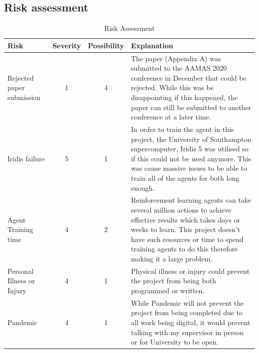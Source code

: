 \subsection*{Risk assessment}
\begin{table}[h]
    \centering
    \begin{tabular}{|p{3cm}|c|c|p{7cm}|} \hline
        \textbf{Risk}  & \textbf{Severity} & \textbf{Possibility} & \textbf{Explanation} \\ \hline
        Rejected paper submission & 1 & 4 & The paper (Appendix A) was submitted to the AAMAS 2020 conference in
            December that could be rejected. While this was be disappointing if this happened, the paper can still be
            submitted to another conference at a later time. \\ \hline
        Iridis failure & 5 & 1 & In order to train the agent in this project, the University of Southampton supercomputer,
            Iridis 5 was utilised so if this could not be used anymore. This was cause massive issues to be able to
            train all of the agents for both long enough. \\ \hline
        Agent Training time & 4 & 2 & Reinforcement learning agents can take several million actions to achieve
            effective results which takes days or weeks to learn. This project doesn't have such resources or time to
            spend training agents to do this therefore making it a large problem. \\ \hline
        Personal Illness or Injury & 4 & 1 & Physical illness or injury could prevent the project from being both
            programmed or written. \\ \hline
        Pandemic & 4 & 1 & While Pandemic will not prevent the project from being completed due to all work being
            digital, it would prevent talking with my supervisor in person or for University to be open. \\ \hline
    \end{tabular}
    \caption{Risk Assessment}
    \label{tab:risk_assessment}
\end{table}


